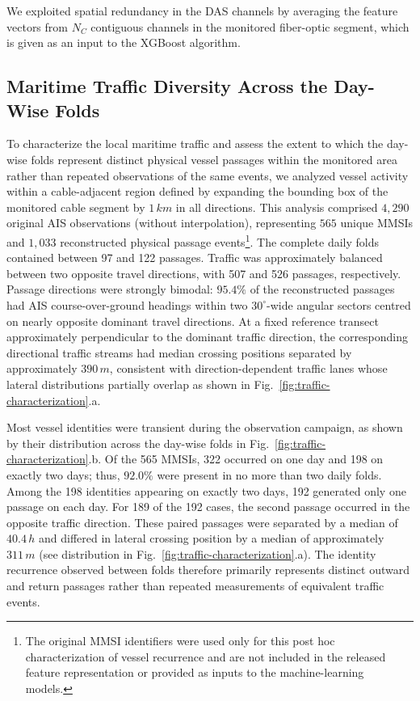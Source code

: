 \documentclass[11pt]{article}
\begin{document}
We exploited spatial redundancy in the DAS channels by averaging the feature vectors from $N_C$ contiguous channels in the monitored fiber-optic segment, which is given as an input to the XGBoost algorithm.

\subsection{Maritime Traffic Diversity Across the Day-Wise Folds}
\label{sec:marit-traff-divers}

To characterize the local maritime traffic and assess the extent to which the day-wise folds represent distinct physical vessel passages within the monitored area rather than repeated observations of the same events, we analyzed vessel activity within a cable-adjacent region defined by expanding the bounding box of the monitored cable segment by $1\,km$ in all directions. This analysis comprised $4,290$ original AIS observations (without interpolation), representing $565$ unique MMSIs and $1,033$ reconstructed physical passage events\footnote{The original MMSI identifiers were used only for this post hoc characterization of vessel recurrence and are not included in the released feature representation or provided as inputs to the machine-learning models.}. The complete daily folds contained between 97 and 122 passages. %
Traffic was approximately balanced between two opposite travel directions, with 507 and 526 passages, respectively. Passage directions were strongly bimodal: $95.4\%$ of the reconstructed passages had AIS course-over-ground headings within two \(30^{\circ}\)-wide angular sectors centred on nearly opposite dominant travel directions. At a fixed reference transect approximately perpendicular to the dominant traffic direction, the corresponding directional traffic streams had median crossing positions separated by approximately $390\,m$, consistent with direction-dependent traffic lanes whose lateral distributions partially overlap as shown in Fig.~\ref{fig:traffic-characterization}.a.

Most vessel identities were transient during the observation campaign, as shown by their distribution across the day-wise folds in Fig.~\ref{fig:traffic-characterization}.b. Of the 565 MMSIs, 322 occurred on one day and 198 on exactly two days; thus, $92.0\%$ were present in no more than two daily folds. Among the 198 identities appearing on exactly two days, 192 generated only one passage on each day. For 189 of the 192 cases, the second passage occurred in the opposite traffic direction. These paired passages were separated by a median of $40.4\,h$ and differed in lateral crossing position by a median of approximately $311\,m$ (see distribution in Fig.~\ref{fig:traffic-characterization}.a). The identity recurrence observed between folds therefore primarily represents distinct outward and return passages rather than repeated measurements of equivalent traffic events.
\end{document}
